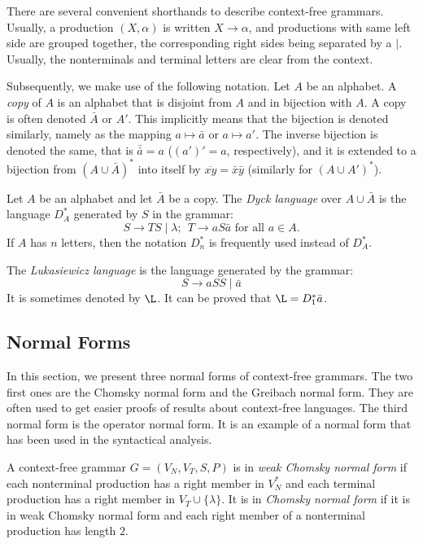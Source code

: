 There are several convenient shorthands to describe context-free grammars. Usually, a production $(X, \alpha)$ is written $X \to \alpha$, and productions with same left side are grouped together, the corresponding right sides being separated by a $\mid$. Usually, the nonterminals and terminal letters are clear from the context.

Subsequently, we make use of the following notation. Let $A$ be an alphabet. A \emph{copy} of $A$ is an alphabet that is disjoint from $A$ and in bijection with $A$. A copy is often denoted $\bar{A}$ or $A'$. This implicitly means that the bijection is denoted similarly, namely as the mapping $a \mapsto \bar{a}$ or $a \mapsto a'$. The inverse bijection is denoted the same, that is $\bar{\bar{a}} = a$ ($(a')' = a$, respectively), and it is extended to a bijection from $(A \cup \bar{A})^*$ into itself  by $\overline{xy} = \bar{x} \bar{y}$ (similarly for $(A \cup A')^*$).

Let $A$ be an alphabet and let $\bar{A}$ be a copy. The \emph{Dyck language} over $A \cup \bar{A}$ is the language $D^*_A$ generated by $S$ in the grammar: 
$$S \to TS \mid \lambda; \ \ T \to a S \bar{a} \text{ for all } a \in A.$$
If $A$ has $n$ letters, then the notation $D^*_n$ is frequently used instead of $D^*_A$.

The \emph{Lukasiewicz language} is the language generated by the grammar:
$$S \to aSS \mid \bar{a}$$ It is sometimes denoted by ${\L}$. It can be proved that ${\L} = D^*_1 \bar{a}$.

\subsection{Normal Forms}
\label{subsection:context-free-normal-forms}

In this section, we present three normal forms of context-free grammars. The two first ones are the  Chomsky normal form and the Greibach normal form. They are often used to get easier proofs of results about context-free languages. The third normal form is the operator normal form. It is an example of a normal form that has been used in the syntactical analysis.

A context-free grammar $G = (V_N, V_T, S, P)$ is in \emph{weak Chomsky normal form} if each nonterminal production has a right member in $V_N^*$ and each terminal production has a right member in $V_T \cup \{\lambda\}$. It is in \emph{Chomsky normal form} if it is in weak Chomsky normal form and each right member of a nonterminal production has length $2$.

